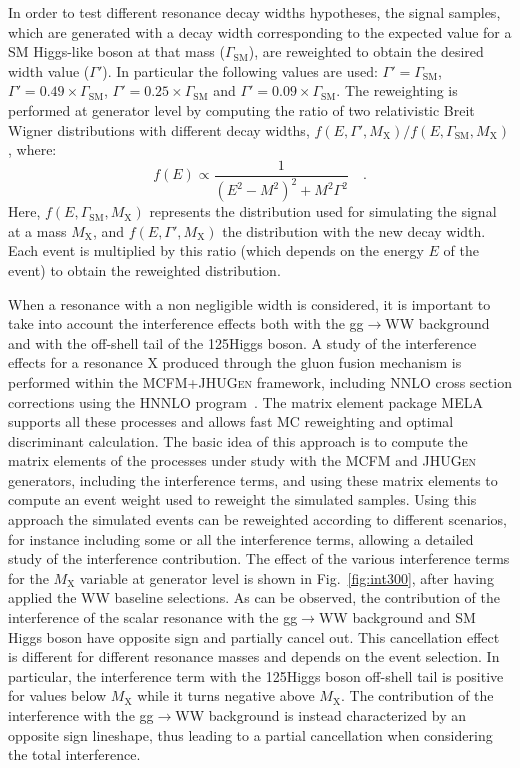In order to test different resonance decay widths hypotheses, the signal samples, which are generated with a decay width corresponding to the expected value for a SM Higgs-like boson at that mass ($\Gamma_\mathrm{SM}$), are reweighted to obtain the desired width value ($\Gamma'$). In particular the following values are used: $\Gamma' = \Gamma_\mathrm{SM}$, $\Gamma' = 0.49 \times \Gamma_\mathrm{SM}$, $\Gamma' = 0.25 \times \Gamma_\mathrm{SM}$ and $\Gamma' = 0.09 \times \Gamma_\mathrm{SM}$.
The reweighting is performed at generator level by computing the ratio of two relativistic Breit Wigner distributions with different decay widths, $f(E,\Gamma',M_\mathrm{X})/f(E,\Gamma_\mathrm{SM},M_\mathrm{X})$, where:
\begin{equation}
f(E) \propto \frac{1}{(E^2 - M^2)^2 + M^2\Gamma^2} \quad .
\end{equation}
Here, $f(E,\Gamma_\mathrm{SM},M_\mathrm{X})$ represents the distribution used for simulating the signal at a mass $M_\mathrm{X}$, and $f(E,\Gamma',M_\mathrm{X})$ the distribution with the new decay width. Each event is multiplied by this ratio (which depends on the energy $E$ of the event) to obtain the reweighted distribution.

When a resonance with a non negligible width is considered, it is important to take into account the interference effects both with the gg$\to$WW background and with the off-shell tail of the 125\GeV Higgs boson.
A study of the interference effects for a resonance X produced through the gluon fusion mechanism is performed within the \textsc{MCFM}+\textsc{JHUGen} framework, including NNLO cross section corrections using the \textsc{HNNLO} program~\cite{Grazzini:2008tf}. The matrix element package MELA supports all these processes and allows fast MC reweighting and optimal discriminant calculation. The basic idea of this approach is to compute the matrix elements of the processes under study with the \textsc{MCFM} and \textsc{JHUGen} generators, including the interference terms, and using these matrix elements to compute an event weight used to reweight the simulated samples. Using this approach the simulated events can be reweighted according to different scenarios, for instance including some or all the interference terms, allowing a detailed study of the interference contribution. The effect of the various interference terms for the $M_\mathrm{X}$ variable at generator level is shown in Fig.~\ref{fig:int300}, after having applied the WW baseline selections. As can be observed, the contribution of the interference of the scalar resonance with the gg$\to$WW background and SM Higgs boson have opposite sign and partially cancel out. This cancellation effect is different for different resonance masses and depends on the event selection.
In particular, the interference term with the 125\GeV Higgs boson off-shell tail is positive for values below $M_\mathrm{X}$ while it turns negative above $M_\mathrm{X}$. The contribution of the interference with the gg$\to$WW background is instead characterized by an opposite sign lineshape, thus leading to a partial cancellation when considering the total interference.

